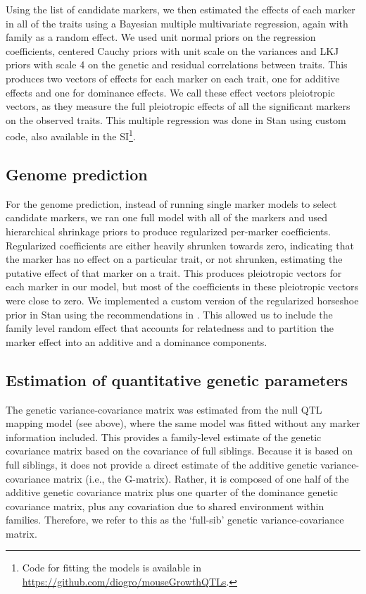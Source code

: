 \begin{refsection}
Using the list of candidate markers, we then estimated the effects of each
marker in all of the traits using a Bayesian multiple multivariate regression,
again with family as a random effect. We used unit normal priors on the
regression coefficients, centered Cauchy priors with unit scale on the
variances and LKJ priors with scale 4 on the genetic and residual correlations
between traits. This produces two vectors of effects for each marker on each
trait, one for additive effects and one for dominance effects. We call these
effect vectors pleiotropic vectors, as they measure the full pleiotropic
effects of all the significant markers on the observed traits.
This multiple regression was done in Stan \parencite{Carpenter2017-pn} using custom code,
also available in the SI\footnote{Code for fitting the models is available in
\url{https://github.com/diogro/mouseGrowthQTLs}.}.

\subsection{Genome prediction}

For the genome prediction, instead of running single marker models to select
candidate markers, we ran one full model with all of the markers and used
hierarchical shrinkage priors to produce regularized per-marker coefficients.
Regularized coefficients are either heavily shrunken towards zero, indicating
that the marker has no effect on a particular trait, or not shrunken,
estimating the putative effect of that marker on a trait. This produces
pleiotropic vectors for each marker in our model, but most of the coefficients
in these pleiotropic vectors were close to zero. We implemented a custom
version of the regularized horseshoe prior in Stan using the recommendations
in \textcite{Piironen2017-ih}. This allowed us to include the family level
random effect that accounts for relatedness and to partition the marker effect
into an additive and a dominance components.

\subsection{Estimation of quantitative genetic parameters}

The genetic variance-covariance matrix was estimated from the null QTL
mapping model (see above), where the same model was fitted without any
marker information included. This provides a family-level estimate of
the genetic covariance matrix based on the covariance of full siblings. Because it is
based on full siblings, it does not provide a direct estimate of the
additive genetic variance-covariance matrix (i.e., the G-matrix).
Rather, it is composed of one half of the additive genetic covariance
matrix plus one quarter of the dominance genetic covariance matrix, plus
any covariation due to shared environment within families. Therefore, we
refer to this as the `full-sib' genetic variance-covariance matrix.


\end{refsection}
